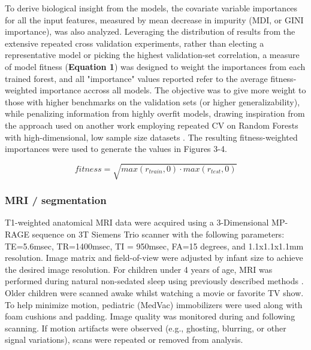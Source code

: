 \documentclass{article}
\begin{document}
To derive biological insight from the models, the covariate variable
importances for all the input features, measured by mean decrease in
impurity (MDI, or GINI importance), was also analyzed. Leveraging the
distribution of results from the extensive repeated cross validation
experiments, rather than electing a representative model or picking the
highest validation-set correlation, a measure of model fitness
(\textbf{Equation 1}) was designed to weight the importances from each
trained forest, and all "importance" values reported refer to 
the average fitness-weighted importance accross all models.
The objective was to give more weight to those with
higher benchmarks on the validation sets (or higher generalizability),
while penalizing information from highly overfit models, drawing
inspiration from the approach used on another work employing repeated CV
on Random Forests with high-dimensional, low sample size
datasets \cite{woodruffInflammationAutoreactivityDefine2022}.
The resulting fitness-weighted importances were used
to generate the values in Figures 3-4.

\begin{equation}
    fitness = \sqrt{max(r_{train}, 0) \cdot max(r_{test}, 0)}
\end{equation}


\subsubsection*{MRI / segmentation}

T1-weighted anatomical MRI data were acquired using a 3-Dimensional MP-RAGE sequence
on 3T Siemens Trio scanner with the following parameters:
TE=5.6msec, TR=1400msec, TI = 950msec, FA=15 degrees, and 1.1x1.1x1.1mm resolution.
Image matrix and field-of-view were adjusted by infant size to achieve the desired image resolution.
For children under 4 years of age, MRI was performed during natural non-sedated sleep using previously described methods \cite{deanPediatricNeuroimagingUsing2014}.
Older children were scanned awake whilst watching a movie or favorite TV show.
To help minimize motion, pediatric (MedVac) immobilizers were used along with foam cushions and padding.
Image quality was monitored during and following scanning.
If motion artifacts were observed (e.g., ghosting, blurring, or other signal variations),
scans were repeated or removed from analysis.
\end{document}

